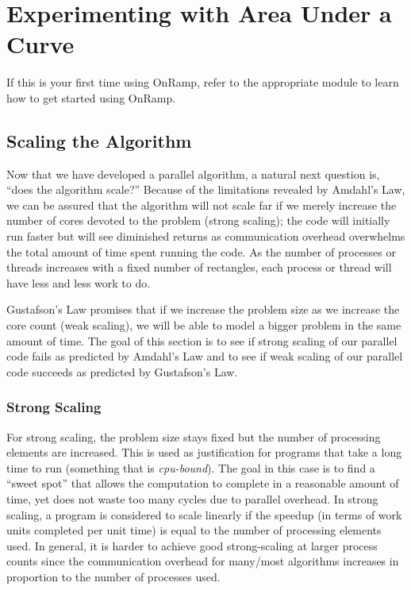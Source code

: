 \documentclass[a4paper, 11pt]{article}
\begin{document}

\section{Experimenting with Area Under a Curve}

If this is your first time using OnRamp, refer to the appropriate module to learn how to get started using OnRamp.


\subsection{Scaling the Algorithm}

Now that we have developed a parallel algorithm, a natural next question is, ``does the algorithm scale?''  Because of the limitations revealed by Amdahl's Law, we can be assured that the algorithm will not scale far if we merely increase the number of cores devoted to the problem (strong scaling); the code will initially run faster but will see diminished returns as communication overhead overwhelms the total amount of time spent running the code.  As the number of processes or threads increases with a fixed number of rectangles, each process or thread will have less and less work to do.

Gustafson's Law promises that if we increase the problem size as we increase the core count (weak scaling), we will be able to model a bigger problem in the same amount of time.  The goal of this section is to see if strong scaling of our parallel code fails as predicted by Amdahl's Law and to see if weak scaling of our parallel code succeeds as predicted by Gustafson's Law.


\subsubsection{Strong Scaling}

For strong scaling, the problem size stays fixed but the number of processing elements are increased. This is used as justification for programs that take a long time to run (something that is \emph{cpu-bound}). The goal in this case is to find a ``sweet spot'' that allows the computation to complete in a reasonable amount of time, yet does not waste too many cycles due to parallel overhead. In strong scaling, a program is considered to scale linearly if the speedup (in terms of work units completed per unit time) is equal to the number of processing elements used. In general, it is harder to achieve good strong-scaling at larger process counts since the communication overhead for many/most algorithms increases in proportion to the number of processes used\cite{website:SHARCNET:2015}.
\end{document}
